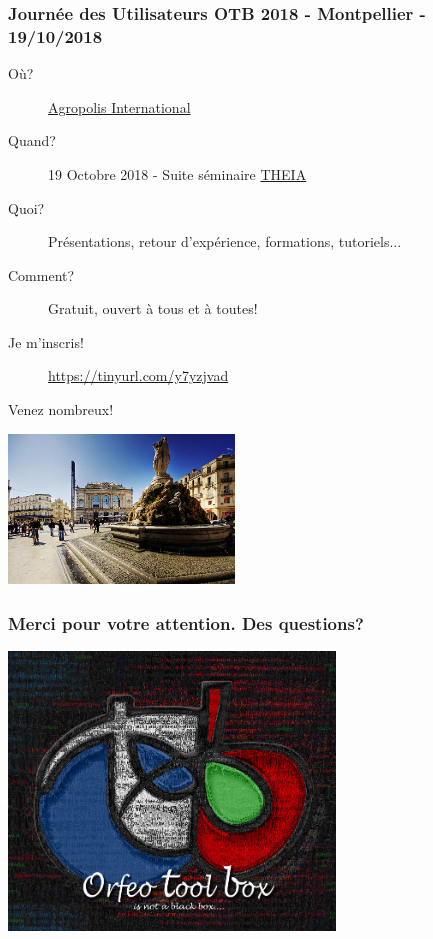 \documentclass[8pt]{beamer}
\begin{document}
\begin{frame}
  \frametitle{Journée des Utilisateurs OTB 2018 - Montpellier - 19/10/2018}
  \begin{description}
  \item[Où?] \href{http://www.agropolis.fr/pratique/locaux.php}{Agropolis International}
  \item[Quand?] 19 Octobre 2018 - Suite séminaire \href{http://theia2018.sciencesconf.org}{THEIA}
  \item[Quoi?] Présentations, retour d'expérience, formations, tutoriels...
  \item[Comment?] Gratuit, ouvert à tous et à toutes!
  \item[Je m'inscris!] \url{https://tinyurl.com/y7yzjvad}
  \end{description}
  \begin{center}
    \alert{Venez nombreux!}
  \end{center}
  \begin{center}
    \includegraphics[width=0.45\textwidth]{images/montpellier.jpg}
  \end{center}

  
\end{frame}
  
\begin{frame}
\frametitle{Merci pour votre attention. Des questions?}
\begin{minipage}[t][6cm][t]{\textwidth}
\begin{center}
\includegraphics[width=0.65\textwidth]{images/LOGOTB_blackbox.png}
\end{center}
\end{minipage}
\end{frame}
\end{document}
